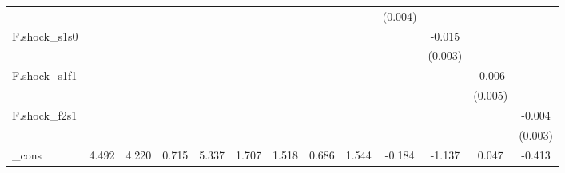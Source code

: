 {\begin{tabular}{l*{12}{c}}
            &                     &                     &                     &                     &                     &                     &                     &                     &     (0.004)         &                     &                     &                     \\
\addlinespace
F.shock\_s1s0&                     &                     &                     &                     &                     &                     &                     &                     &                     &      -0.015\sym{***}&                     &                     \\
            &                     &                     &                     &                     &                     &                     &                     &                     &                     &     (0.003)         &                     &                     \\
\addlinespace
F.shock\_s1f1&                     &                     &                     &                     &                     &                     &                     &                     &                     &                     &      -0.006         &                     \\
            &                     &                     &                     &                     &                     &                     &                     &                     &                     &                     &     (0.005)         &                     \\
\addlinespace
F.shock\_f2s1&                     &                     &                     &                     &                     &                     &                     &                     &                     &                     &                     &      -0.004         \\
            &                     &                     &                     &                     &                     &                     &                     &                     &                     &                     &                     &     (0.003)         \\
\addlinespace
\_cons      &       4.492\sym{***}&       4.220\sym{***}&       0.715         &       5.337\sym{***}&       1.707\sym{**} &       1.518\sym{*}  &       0.686         &       1.544\sym{**} &      -0.184         &      -1.137         &       0.047         &      -0.413\sym{***}\\

\end{tabular}}
